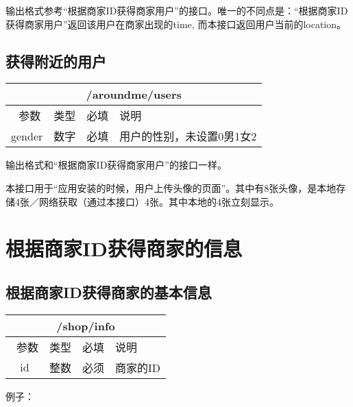 \documentclass[cs4size]{ctexartutf8}
\begin{document}
输出格式参考“根据商家ID获得商家用户”的接口。唯一的不同点是：“根据商家ID获得商家用户”返回该用户在商家出现的time, 而本接口返回用户当前的location。




\subsection{获得附近的用户}

\begin{table}[H]
   \begin{center}
\begin{tabular}{|c|c|c|p{12cm}|}
\hline
\multicolumn{4}{|c|}{/aroundme/users} \\
\hline\hline
 \  参数  & 类型 & 必填 &  说明  \\
 \hline
 gender  & 数字 & 必填 &  用户的性别，未设置0男1女2\\
\hline
\end{tabular}
   \end{center}
\end{table}

输出格式和“根据商家ID获得商家用户”的接口一样。

本接口用于“应用安装的时候，用户上传头像的页面”。其中有8张头像，是本地存储4张／网络获取（通过本接口）4张。其中本地的4张立刻显示。

\section{根据商家ID获得商家的信息}
\subsection{根据商家ID获得商家的基本信息}

\begin{table}[H]
   \begin{center}
\begin{tabular}{|c|c|c|p{12cm}|}
\hline
\multicolumn{4}{|c|}{/shop/info} \\
\hline\hline
 \  参数  & 类型 & 必填 &  说明  \\
\hline
 id  & 整数 & 必须 & 商家的ID\\
\hline
\end{tabular}
   \end{center}
\end{table}

例子：
\end{document}
